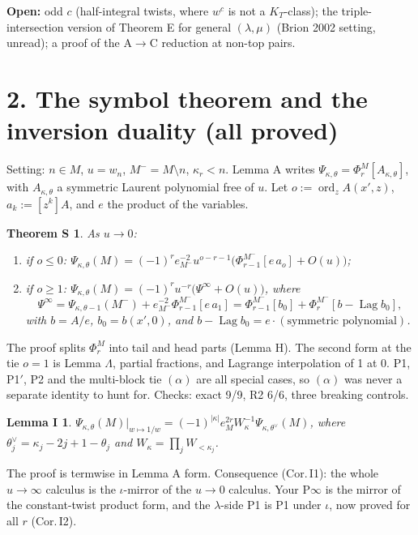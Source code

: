 \documentclass[11pt]{article}
\newcommand{\gr}[1]{\textsf{#1}}
\newcommand{\Lag}{\operatorname{Lag}}
\newcommand{\ord}{\operatorname{ord}}
\theoremstyle{plain}
\newtheorem*{thmS}{Theorem S}
\newtheorem*{lemI}{Lemma I}
\begin{document}
\textbf{Open:} odd $c$ (half-integral twists, where $w^c$ is not a $K_T$-class); the triple-intersection version of
Theorem E for general $(\lambda,\mu)$ (Brion 2002 setting, unread); a proof of the A$\to$C reduction at non-top pairs.

\section*{2. The symbol theorem and the inversion duality (all \gr{proved})}
Setting: $n\in M$, $u=w_n$, $M^-=M\setminus n$, $\kappa_r<n$. Lemma A writes
$\Psi_{\kappa,\theta}=\Phi^M_r[A_{\kappa,\theta}]$, with $A_{\kappa,\theta}$ a symmetric Laurent polynomial free of $u$.
Let $o:=\ord_zA(x',z)$, $a_k:=[z^k]A$, and $e$ the product of the variables.

\begin{thmS}
As $u\to0$:
\begin{enumerate}[leftmargin=*,itemsep=1pt]
\item if $o\le0$: $\Psi_{\kappa,\theta}(M)=(-1)^re_{M^-}^{-2}u^{o-r-1}\big(\Phi^{M^-}_{r-1}[e\,a_o]+O(u)\big)$;
\item if $o\ge1$: $\Psi_{\kappa,\theta}(M)=(-1)^ru^{-r}\big(\Psi^\infty+O(u)\big)$, where
\[\Psi^\infty=\Psi_{\kappa,\theta-1}(M^-)+e_{M^-}^{-2}\Phi^{M^-}_{r-1}[e\,a_1]
=\Phi^{M^-}_{r-1}[b_0]+\Phi^{M^-}_r[b-\Lag b_0],\]
with $b=A/e$, $b_0=b(x',0)$, and $b-\Lag b_0=e\cdot(\text{symmetric polynomial})$.
\end{enumerate}
\end{thmS}
The proof splits $\Phi_r^M$ into tail and head parts (Lemma H). The second form at the tie $o=1$ is Lemma $\Lambda$,
partial fractions, and Lagrange interpolation of 1 at 0. P1, P1$'$, P2 and the multi-block tie $(\alpha)$ are all
special cases, so $(\alpha)$ was never a separate identity to hunt for. Checks: exact 9/9, R2 6/6, three breaking
controls.

\begin{lemI}
$\Psi_{\kappa,\theta}(M)\big|_{w\mapsto1/w}=(-1)^{|\kappa|}e_M^{2r}W_\kappa^{-1}\Psi_{\kappa,\theta^\vee}(M)$, where
$\theta^\vee_j=\kappa_j-2j+1-\theta_j$ and $W_\kappa=\prod_jW_{<\kappa_j}$.
\end{lemI}
The proof is termwise in Lemma A form. Consequence (Cor.\,I1): the whole $u\to\infty$ calculus is the $\iota$-mirror of
the $u\to0$ calculus. Your P$\infty$ is the mirror of the constant-twist product form, and the $\lambda$-side P1 is P1
under $\iota$, now proved for all $r$ (Cor.\,I2).
\end{document}
